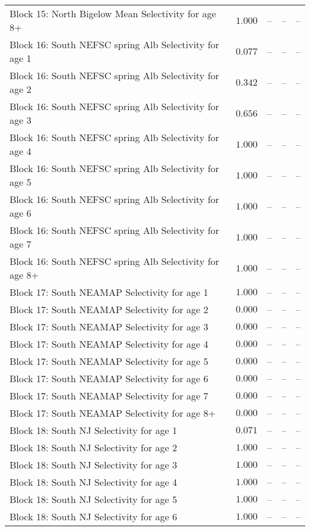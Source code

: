 \documentclass[
]{article}
\begin{document}
\begin{landscape}
\begin{longtable}[t]{lrrrr}
Block 15: North Bigelow Mean Selectivity for age 8+ & $1.000$ & -- & -- & --\\
Block 16: South NEFSC spring Alb Selectivity for age 1 & $0.077$ & -- & -- & --\\
Block 16: South NEFSC spring Alb Selectivity for age 2 & $0.342$ & -- & -- & --\\
Block 16: South NEFSC spring Alb Selectivity for age 3 & $0.656$ & -- & -- & --\\
\addlinespace
Block 16: South NEFSC spring Alb Selectivity for age 4 & $1.000$ & -- & -- & --\\
Block 16: South NEFSC spring Alb Selectivity for age 5 & $1.000$ & -- & -- & --\\
Block 16: South NEFSC spring Alb Selectivity for age 6 & $1.000$ & -- & -- & --\\
Block 16: South NEFSC spring Alb Selectivity for age 7 & $1.000$ & -- & -- & --\\
Block 16: South NEFSC spring Alb Selectivity for age 8+ & $1.000$ & -- & -- & --\\
\addlinespace
Block 17: South NEAMAP Selectivity for age 1 & $1.000$ & -- & -- & --\\
Block 17: South NEAMAP Selectivity for age 2 & $0.000$ & -- & -- & --\\
Block 17: South NEAMAP Selectivity for age 3 & $0.000$ & -- & -- & --\\
Block 17: South NEAMAP Selectivity for age 4 & $0.000$ & -- & -- & --\\
Block 17: South NEAMAP Selectivity for age 5 & $0.000$ & -- & -- & --\\
\addlinespace
Block 17: South NEAMAP Selectivity for age 6 & $0.000$ & -- & -- & --\\
Block 17: South NEAMAP Selectivity for age 7 & $0.000$ & -- & -- & --\\
Block 17: South NEAMAP Selectivity for age 8+ & $0.000$ & -- & -- & --\\
Block 18: South NJ Selectivity for age 1 & $0.071$ & -- & -- & --\\
Block 18: South NJ Selectivity for age 2 & $1.000$ & -- & -- & --\\
\addlinespace
Block 18: South NJ Selectivity for age 3 & $1.000$ & -- & -- & --\\
Block 18: South NJ Selectivity for age 4 & $1.000$ & -- & -- & --\\
Block 18: South NJ Selectivity for age 5 & $1.000$ & -- & -- & --\\
Block 18: South NJ Selectivity for age 6 & $1.000$ & -- & -- & --\\

\end{longtable}
\end{landscape}
\end{document}
